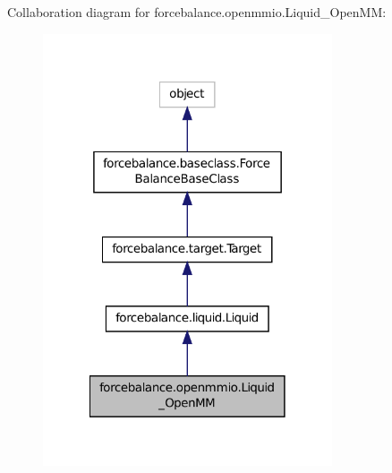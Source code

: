 Collaboration diagram for forcebalance.\-openmmio.\-Liquid\-\_\-\-Open\-M\-M\-:\nopagebreak
\begin{figure}[H]
\begin{center}
\leavevmode
\includegraphics[width=242pt]{classforcebalance_1_1openmmio_1_1Liquid__OpenMM__coll__graph}
\end{center}
\end{figure}
